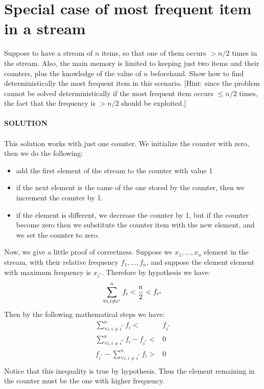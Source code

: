 \documentclass[a4paper]{article}
\begin{document}
\section*{Special case of most frequent item in a stream}
Suppose to have a stream of $n$ items, so that one of them occurs $> n/2$ times in the stream. Also, the main memory is limited to keeping just two items and their counters, plus the knowledge of the value of $n$ beforehand. Show how to find deterministically the most frequent item in this scenario. [Hint: since the problem cannot be solved deterministically if the most frequent item occurs $\leq n/2$ times, the fact that the frequency is $> n/2$ should be exploited.]
\\
\\
\textbf{SOLUTION}
\\
\\
This solution works with just one counter. We initialize the counter with zero, then we do the following:
\begin{itemize}
\item add the first element of the stream to the counter with value 1
\item if the next element is the same of the one stored by the counter, then we increment the counter by 1.
\item if the element is different, we decrease the counter by 1, but if the counter become zero then we substitute the counter item with the new element, and we set the counter to zero.
\end{itemize} 
Now, we give a little proof of correctness. Suppose we $x_1,\dots ,x_n$ element in the stream, with their relative frequency $f_1,\dots , f_n$, and suppose the element element with maximum frequency is $x_{i^*}$. Therefore by hypothesis we have: 
\begin{equation}
\centering
\sum_{\forall i, i\neq i^*}^n f_i < \frac{n}{2} < f_{i^*}
\nonumber
\end{equation} 
Then by the following mathematical steps we have:
\begin{align*}
\sum_{\forall i, i\neq i^*}^n f_i <& f_{i^*} \\
\sum_{\forall i, i\neq i^*}^n f_i -  f_{i^*}<&0 \\
f_{i^*}- \sum_{\forall i, i\neq i^*}^n f_i >&0 \\
\end{align*}
Notice that this inequality is true by hypothesis. Thus the element remaining in the counter must be the one with higher frequency.
\end{document}
